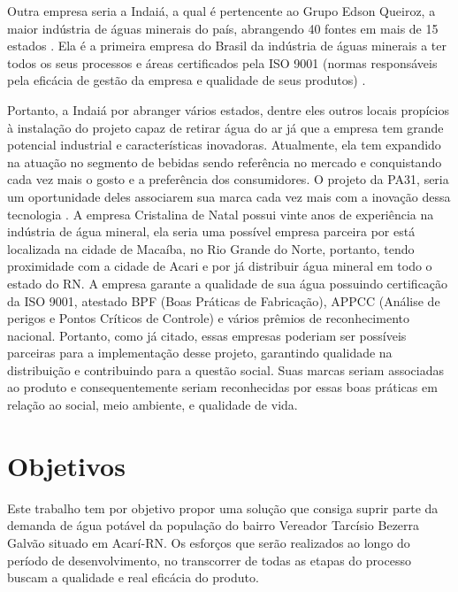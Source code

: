       Outra empresa seria a Indaiá, a qual é pertencente ao Grupo Edson Queiroz, a maior indústria de águas minerais do país, 
      abrangendo 40 fontes em mais de 15 estados \footnotemark.
      Ela é a primeira empresa do Brasil da indústria de águas minerais
      a ter todos os seus processos e áreas certificados pela ISO 9001 (normas responsáveis pela eficácia de gestão da empresa e qualidade de seus produtos) \cite{iso9001}.
      
      Portanto, a Indaiá por abranger vários estados, dentre eles outros locais propícios à instalação do projeto capaz de retirar água do ar já que a empresa tem grande potencial industrial e características inovadoras. Atualmente, ela tem expandido na
      atuação no segmento de bebidas sendo referência no mercado e conquistando cada vez mais o gosto e a preferência dos
      consumidores. O projeto da PA31, seria um oportunidade deles associarem sua marca cada vez mais com a inovação dessa
      tecnologia \footnotemark.
	A empresa Cristalina de Natal possui vinte anos de experiência na indústria de água mineral, ela seria uma possível empresa parceira por está localizada na cidade de Macaíba, no Rio Grande do Norte, portanto, tendo proximidade com a cidade de Acari e por já distribuir água mineral em todo o estado do RN\footnotemark. A empresa garante a qualidade de sua água possuindo certificação da ISO 9001, atestado BPF (Boas Práticas de Fabricação), APPCC (Análise de perigos e Pontos Críticos de Controle) e vários prêmios de reconhecimento nacional\footnotemark.
	Portanto, como já citado, essas empresas poderiam ser possíveis parceiras para a implementação desse projeto, garantindo qualidade na distribuição e contribuindo para a questão social. Suas marcas seriam associadas ao produto e consequentemente seriam reconhecidas por essas boas práticas em relação ao social, meio ambiente, e qualidade de vida.
      
      

    
\pagebreak
\section{Objetivos}

Este trabalho tem por objetivo propor uma solução que consiga suprir parte da demanda de água potável da população do bairro Vereador Tarcísio Bezerra Galvão situado em Acarí-RN. Os esforços que serão realizados ao longo do período de desenvolvimento, no transcorrer de todas as etapas do processo buscam a qualidade e real eficácia do produto.

